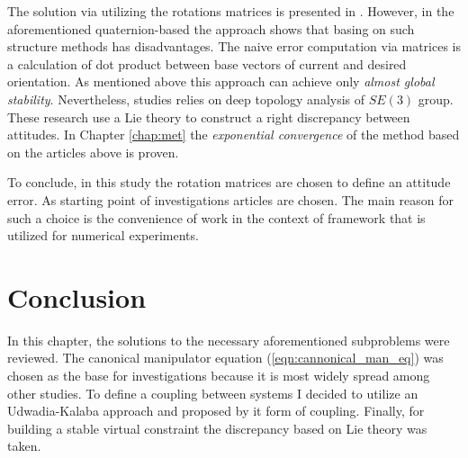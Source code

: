 The solution via utilizing the rotations matrices is presented in
\cite{GeomControlQuadSE3,RigidBodyAttCon,OutFeedbackStabForOrbRob,
ANonlinearObserverUsingPose}. However, in the aforementioned quaternion-based
the approach shows that basing on such structure methods has disadvantages.
The naive error computation via matrices is a calculation of dot product
between base vectors of current and desired orientation. As mentioned
above this approach can achieve only \emph{almost global stability}.
Nevertheless, studies \cite{OutFeedbackStabForOrbRob, ANonlinearObserverUsingPose}
relies on deep topology analysis of $SE(3)$ group. These research use
a Lie theory to construct a right discrepancy between attitudes. In
Chapter \ref{chap:met} the \emph{exponential convergence} of the method
based on the articles above is proven.


To conclude, in this study the rotation matrices are chosen to define an
attitude error. As starting point of investigations articles
\cite{OutFeedbackStabForOrbRob,ANonlinearObserverUsingPose} are chosen.
The main reason for such a choice is the convenience of work in the context of
framework \cite{Pinocchio} that is utilized for numerical experiments.


\section{Conclusion} \label{sec:lr_conclusion}


In this chapter, the solutions to the necessary aforementioned subproblems
were reviewed. The canonical manipulator equation (\ref{eqn:cannonical_man_eq})
was chosen as the base for investigations because it is most widely spread
among other studies. To define a coupling between systems I decided to
utilize an Udwadia-Kalaba approach and proposed by it form of coupling.
Finally, for building a stable virtual constraint the discrepancy based
on Lie theory was taken.



